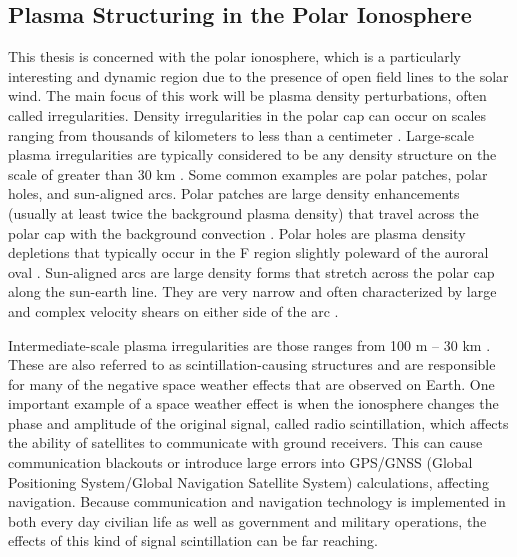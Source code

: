\subsection{Plasma Structuring in the Polar Ionosphere}
\label{sec:polar_structure}
This thesis is concerned with the polar ionosphere, which is a particularly interesting and dynamic region due to the presence of open field lines to the solar wind.  The main focus of this work will be plasma density perturbations, often called irregularities.  Density irregularities in the polar cap can occur on scales ranging from thousands of kilometers to less than a centimeter \citep{Tsunoda1988}.  Large-scale plasma irregularities are typically considered to be any density structure on the scale of greater than 30 km \citep{Kelley2009}.  Some common examples are polar patches, polar holes, and sun-aligned arcs.  Polar patches are large density enhancements (usually at least twice the background plasma density) that travel across the polar cap with the background convection \citep{Weber1984,Valladares1994}.  Polar holes are plasma density depletions that typically occur in the F region slightly poleward of the auroral oval \citep{Benson2001}.  Sun-aligned arcs are large density forms that stretch across the polar cap along the sun-earth line.  They are very narrow and often characterized by large and complex velocity shears on either side of the arc \citep{Valladares1991}.

Intermediate-scale plasma irregularities are those ranges from 100 m -- 30 km \citep{Kelley2009}.  These are also referred to as scintillation-causing structures and are responsible for many of the negative space weather effects that are observed on Earth.  One important example of a space weather effect is when the ionosphere changes the phase and amplitude of the original signal, called radio scintillation, which affects the ability of satellites to communicate with ground receivers.  This can cause communication blackouts or introduce large errors into GPS/GNSS (Global Positioning System/Global Navigation Satellite System) calculations, affecting navigation.  Because communication and navigation technology is implemented in both every day civilian life as well as government and military operations, the effects of this kind of signal scintillation can be far reaching.

